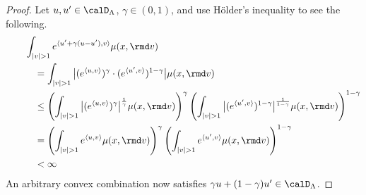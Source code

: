 \begin{proof}
  \label{proof:lemma:odeSpace-convex}
  Let $\momentVar, \momentVar' \in \odeSpace$, $\gamma \in (0,1)$, and use H\"older's inequality to see the following.
  \begin{align}
    \tag*{}
    &\int_{|\markVar|>1} e^\prj{\momentVar' + \gamma(\momentVar-\momentVar')}{\markVar} \affJump(\stateVar,\rmd\markVar) \\
    &\quad= \int_{|\markVar|>1} \big| (e^\prj{\momentVar}{\markVar})^\gamma \cdot (e^\prj{\momentVar'}{\markVar})^{1-\gamma} \big| \affJump(\stateVar,\rmd\markVar) \\
    &\quad\leq \left( \int_{|\markVar|>1} \big| (e^\prj{\momentVar}{\markVar})^\gamma \big|^{\frac{1}{\gamma}} \affJump(\stateVar, \rmd\markVar) \right)^\gamma \left( \int_{|\markVar|>1} \big| (e^\prj{\momentVar'}{\markVar})^{1-\gamma} \big|^{\frac{1}{1-\gamma}} \affJump(\stateVar,\rmd\markVar)\right)^{1-\gamma} \\
    &\quad= \left( \int_{|\markVar|>1} e^\prj{\momentVar}{\markVar} \affJump(\stateVar, \rmd\markVar) \right)^\gamma \left( \int_{|\markVar|>1}  e^\prj{\momentVar'}{\markVar} \affJump(\stateVar,\rmd\markVar)\right)^{1-\gamma} \\
    &\quad<\infty
  \end{align}
  An arbitrary convex combination now satisfies $\gamma\momentVar+(1-\gamma)\momentVar' \in \odeSpace$.
\end{proof}
